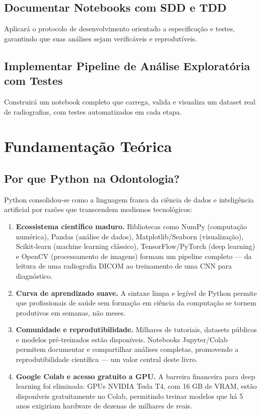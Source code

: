 \subsection{Documentar Notebooks com SDD e TDD}
Aplicará o protocolo de desenvolvimento orientado a especificação e testes, garantindo que suas análises sejam verificáveis e reprodutíveis.

\subsection{Implementar Pipeline de Análise Exploratória com Testes}
Construirá um notebook completo que carrega, valida e visualiza um dataset real de radiografias, com testes automatizados em cada etapa.

\section{Fundamentação Teórica}

\subsection{Por que Python na Odontologia?}

Python  consolidou-se como a linguagem franca da ciência de dados e inteligência artificial por razões que transcendem modismos tecnológicos:

\begin{enumerate}
    \item \textbf{Ecossistema científico maduro.} Bibliotecas como NumPy (computação numérica), Pandas (análise de dados), Matplotlib/Seaborn (visualização), Scikit-learn (machine learning clássico), TensorFlow/PyTorch (deep learning) e OpenCV (processamento de imagens) formam um pipeline completo — da leitura de uma radiografia DICOM ao treinamento de uma CNN para diagnóstico.
    \item \textbf{Curva de aprendizado suave.} A sintaxe limpa e legível de Python permite que profissionais de saúde sem formação em ciência da computação se tornem produtivos em semanas, não meses.
    \item \textbf{Comunidade e reprodutibilidade.} Milhares de tutoriais, datasets públicos e modelos pré-treinados estão disponíveis. Notebooks Jupyter/Colab permitem documentar e compartilhar análises completas, promovendo a reprodutibilidade científica — um valor central deste livro.
    \item \textbf{Google Colab e acesso gratuito a GPU.} A barreira financeira para deep learning foi eliminada: GPUs NVIDIA Tesla T4, com 16 GB de VRAM, estão disponíveis gratuitamente no Colab, permitindo treinar modelos que há 5 anos exigiriam hardware de dezenas de milhares de reais.
\end{enumerate}

